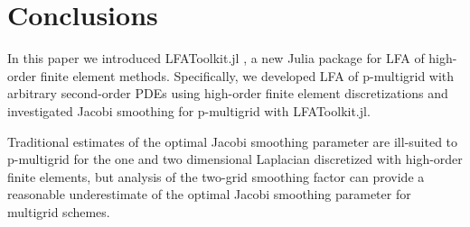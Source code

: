 \documentclass[review]{siamart190516}
\begin{document}
\section{Conclusions}\label{sec:conclusion}

In this paper we introduced LFAToolkit.jl \cite{thompson2021toolkit}, a new Julia package for LFA of high-order finite element methods.
Specifically, we developed LFA of p-multigrid with arbitrary second-order PDEs using high-order finite element discretizations and investigated Jacobi smoothing for p-multigrid with LFAToolkit.jl.

Traditional estimates of the optimal Jacobi smoothing parameter are ill-suited to p-multigrid for the one and two dimensional Laplacian discretized with high-order finite elements, but analysis of the two-grid smoothing factor can provide a reasonable underestimate of the optimal Jacobi smoothing parameter for multigrid schemes.



\end{document}

